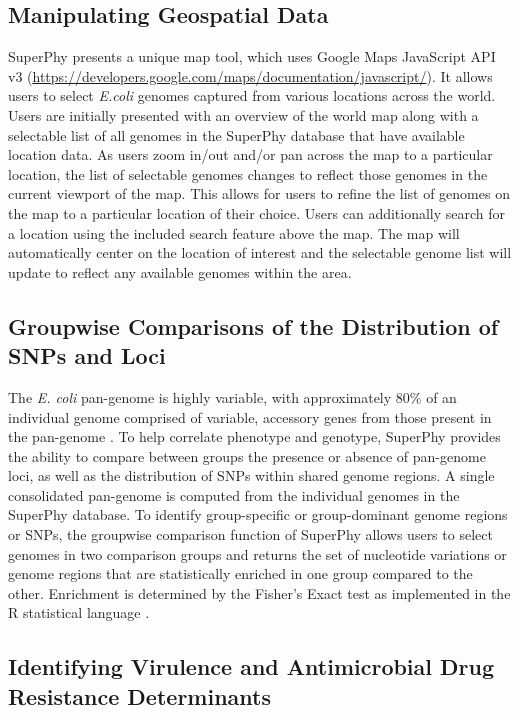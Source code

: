 \documentclass[a4paper,twoside]{article}
\begin{document}
\subsection{Manipulating Geospatial Data}
SuperPhy presents a unique map tool, which uses Google Maps JavaScript API v3 (\url{https://developers.google.com/maps/documentation/javascript/}). It allows users to select \textit{E.coli} genomes captured from various locations across the world. Users are initially presented with an overview of the world map along with a selectable list of all genomes in the SuperPhy database that have available location data. As users zoom in/out and/or pan across the map to a particular location, the list of selectable genomes changes to reflect those genomes in the current viewport of the map. This allows for users to refine the list of genomes on the map to a particular location of their choice. Users can additionally search for a location using the included search feature above the map. The map will automatically center on the location of interest and the selectable genome list will update to reflect any available genomes within the area.  

\subsection{Groupwise Comparisons of the Distribution of SNPs and Loci}

The \textit{E. coli} pan-genome is highly variable, with approximately 80\% of an individual genome comprised of variable, accessory genes from those present in the pan-genome \cite{lukjancenko_comparison_2010}. To help correlate phenotype and genotype, SuperPhy provides the ability to compare between groups the presence or absence of pan-genome loci, as well as the distribution of SNPs within shared genome regions. A single consolidated pan-genome is computed from the individual genomes in the SuperPhy database. To identify group-specific or group-dominant genome regions or SNPs, the groupwise comparison function of SuperPhy allows users to select genomes in two comparison groups and returns the set of nucleotide variations or genome regions that are statistically enriched in one group compared to the other. Enrichment is determined by the Fisher's Exact test as implemented in the R statistical language \cite{R_manual}.


\subsection{Identifying Virulence and Antimicrobial Drug Resistance Determinants}
\end{document}
